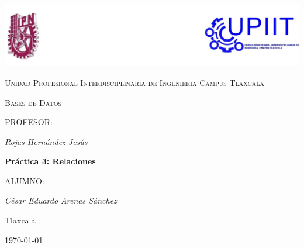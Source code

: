 \documentclass[titlepage,a4paper]{article}
\newcommand{\titulo}{Práctica 3: Relaciones}
\newcommand{\facultad}{Unidad Profesional Interdisciplinaria de Ingeniería Campus Tlaxcala} %
\newcommand{\autor}{César Eduardo Arenas Sánchez}
\newcommand{\profesor}{Rojas Hernández Jesús}
\newcommand{\materia}{Bases de Datos}
\newcommand{\ciudad}{Tlaxcala}
\newcommand{\fecha}{\today} %
\theoremstyle{definition}
\theoremstyle{remark}
\begin{document}
	
	
	\begin{titlepage}
		\centering
		\includegraphics[width=\linewidth]{pictures/escudo.jpg}\par\vspace{0.5cm}
		
		{\scshape\LARGE \facultad\par}
		
		\vspace{1cm}
		
		{\scshape\Large \materia\par}
		
		\vspace{0.5cm}
            PROFESOR:\par
            \vspace{0.2cm}
            {\Large\itshape \profesor}

            \vspace{1.5cm}
		
		{\huge\bfseries \titulo\par}	%
		
		\vspace{3cm}
		ALUMNO:\par
            \vspace{0.2cm}
		{\Large\itshape \autor} %
		
		\vfill
		
		\ciudad\par
		
		\fecha
		
	\end{titlepage}
	
	
\end{document}
